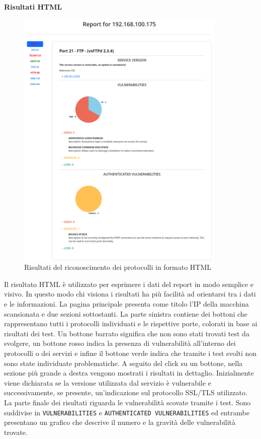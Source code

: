 \documentclass[12pt]{report}
\begin{document}
\newpage
\noindent
\textbf{Risultati HTML}

\begin{figure}[htbp]
	\centering
	\includegraphics[width = 27em]{immagini/Res_html_vuln.png}
	\caption{Risultati del riconoscimento dei protocolli in formato HTML}
	\label{img:html_results}
\end{figure}
\noindent
Il risultato HTML è utilizzato per esprimere i dati del report in modo semplice e visivo. In questo modo chi visiona i risultati ha più facilità ad orientarsi tra i dati e le informazioni. La pagina principale presenta come titolo l'IP della macchina scansionata e due sezioni sottostanti. La parte sinistra contiene dei bottoni che rappresentano tutti i protocolli individuati e le rispettive porte, colorati in base ai risultati dei test. Un bottone barrato significa che non sono stati trovati test da svolgere, un bottone rosso indica la presenza di vulnerabilità all'interno dei protocolli o dei servizi e infine il bottone verde indica che tramite i test svolti non sono state individuate problematiche. A seguito del click su un bottone, nella sezione più grande a destra vengono mostrati i risultati in dettaglio. Inizialmente viene dichiarata se la versione utilizzata dal servizio è vulnerabile e successivamente, se presente, un'indicazione sul protocollo SSL/TLS utilizzato. La parte finale dei risultati riguarda le vulnerabilità scovate tramite i test. Sono suddivise in \lstinline{VULNERABILITIES} e \lstinline{AUTHENTICATED VULNERABILITIES} ed entrambe presentano un grafico che descrive il numero e la gravità delle vulnerabilità trovate.
\end{document}
